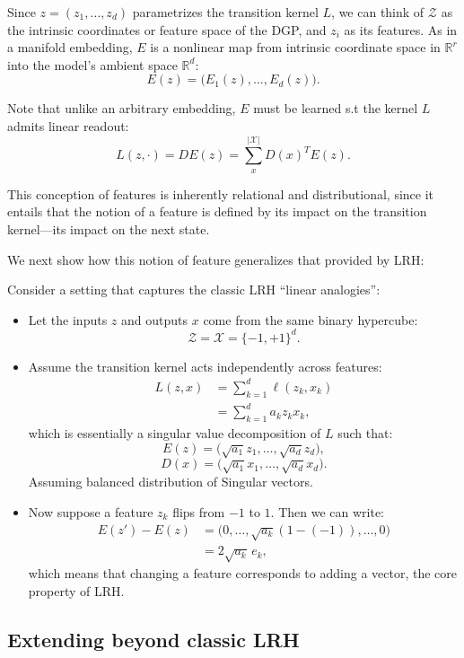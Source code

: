 \documentclass[11pt]{article}
\begin{document}
Since $z=(z_1,\ldots,z_d)$ parametrizes the transition kernel $L$, we can think of $\mathcal Z$ as the intrinsic coordinates or feature space of the DGP, and $z_i$ as its features. As in a manifold embedding, $E$ is a nonlinear map from intrinsic coordinate space in $\mathbb R^r$ into the model's ambient space $\mathbb R^d$:
\[
E(z)=\bigl(E_1(z),\ldots,E_d(z)\bigr).
\]

Note that unlike an arbitrary embedding, $E$ must be learned s.t the kernel $L$ admits linear readout:
\[
L(z,\cdot)=DE(z)=\sum_{x}^{|\mathcal X|}D(x)^T E(z).
\]

This conception of features is inherently relational and distributional, since it entails that the notion of a feature is defined by its impact on the transition kernel---its impact on the next state.

We next show how this notion of feature generalizes that provided by LRH:

Consider a setting that captures the classic LRH ``linear analogies'':

\begin{itemize}
\item Let the inputs $z$ and outputs $x$ come from the same binary hypercube:
\[
\mathcal Z=\mathcal X=\{-1,+1\}^d.
\]

\item Assume the transition kernel acts independently across features:
\begin{align*}
L(z,x)
&=\sum_{k=1}^{d}\ell(z_k,x_k)\\
&=\sum_{k=1}^{d}a_kz_kx_k,
\end{align*}
which is essentially a singular value decomposition of $L$ such that:
\[
E(z)=\bigl(\sqrt{a_1}z_1,\ldots,\sqrt{a_d}z_d\bigr),
\]
\[
D(x)=\bigl(\sqrt{a_1}x_1,\ldots,\sqrt{a_d}x_d\bigr).
\]
Assuming balanced distribution of Singular vectors.

\item Now suppose a feature $z_k$ flips from $-1$ to $1$. Then we can write:
\begin{align*}
E(z')-E(z)
&=\bigl(0,\ldots,\sqrt{a_k}(1-(-1)),\ldots,0\bigr)\\
&=2\sqrt{a_k}\,e_k,
\end{align*}
which means that changing a feature corresponds to adding a vector, the core property of LRH.
\end{itemize}

\subsection{Extending beyond classic LRH}
\end{document}
